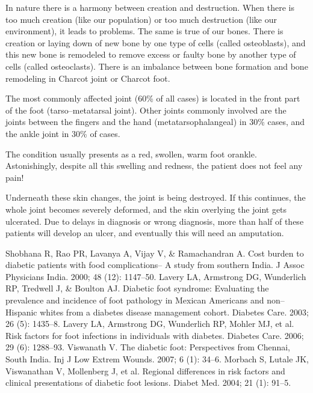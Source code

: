 In nature there is a harmony between creation and destruction. When there is too much creation (like our population) or too much destruction (like our environment), it leads to problems. The same is true of our bones. There is creation or laying down of new bone by one type of cells (called osteoblasts), and this new bone is remodeled to remove excess or faulty bone by another type of cells (called osteoclasts). There is an imbalance between bone formation and bone remodeling in Charcot joint or Charcot foot.

The most commonly affected joint (60\% of all cases) is located in the front part of the foot (tarso–metatarsal joint). Other joints commonly involved are the joints between the fingers and the hand (metata\-rso\-pha\-la\-ngeal) in 30\% cases, and the ankle joint in 30\% of cases.

The condition usually presents as a red, swollen, warm foot or\break ankle. Astonishingly, despite all this swelling and redness, the patient does not feel any pain!

Underneath these skin changes, the joint is being destroyed. If this continues, the whole joint becomes severely deformed, and the skin overlying the joint gets ulcerated. Due to delays in diagnosis or wrong diagnosis, more than half of these patients will develop an ulcer, and eventually this will need an amputation.

\begin{thebibliography}{99}
 Shobhana R, Rao PR, Lavanya A, Vijay V, \& Ramachandran A. Cost burden to diabetic patients with food complications– A study from southern India. J Assoc Physicians India. 2000; 48 (12): 1147–50.
 Lavery LA, Armstrong DG, Wunderlich RP, Tredwell J, \& Boulton AJ. Diabetic foot syndrome: Evaluating the prevalence and incidence of foot pathology in Mexican Americans and non–Hispanic whites from a diabetes disease management cohort. Diabetes Care. 2003; 26 (5): 1435–8.
 Lavery LA, Armstrong DG, Wunderlich RP, Mohler MJ, et al. Risk factors for foot infections in individuals with diabetes. Diabetes Care. 2006; 29 (6): 1288–93.
 Viswanath V. The diabetic foot: Perspectives from Chennai, South India. Inj J Low Extrem Wounds. 2007; 6 (1): 34–6.
 Morbach S, Lutale JK, Viswanathan V, Mollenberg J, et al. Regional differences in risk factors and clinical presentations of diabetic foot lesions. Diabet Med. 2004; 21 (1): 91–5.
\end{thebibliography}

